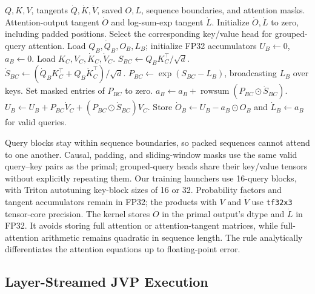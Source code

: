 \documentclass{article} %
\begin{document}
\begin{algorithm}[H]
\caption{Tiled attention JVP using the FlashAttention output and log-sum-exp}
\label{alg:attention-jvp}
\begin{algorithmic}[1]
\Require \(Q,K,V\), tangents \(\dot Q,\dot K,\dot V\), saved \(O,L\),
sequence boundaries, and attention masks.
\Ensure Attention-output tangent \(\dot O\) and log-sum-exp tangent \(\dot L\).
\State Initialize \(\dot O,\dot L\) to zero, including padded positions.
    \State Select the corresponding key/value head for grouped-query attention.
    \State Load \(Q_B,\dot Q_B,O_B,L_B\); initialize FP32 accumulators
        \(U_B\gets0\), \(a_B\gets0\).
        \State Load \(K_C,V_C,\dot K_C,\dot V_C\).
        \State \(S_{BC}\gets Q_BK_C^\top/\sqrt d\).
        \State \(\dot S_{BC}\gets(\dot Q_BK_C^\top+Q_B\dot K_C^\top)/\sqrt d\).
        \State \(P_{BC}\gets\exp(S_{BC}-L_B)\), broadcasting \(L_B\) over keys.
        \State Set masked entries of \(P_{BC}\) to zero.
        \State \(a_B\gets a_B+\operatorname{rowsum}(P_{BC}\odot\dot S_{BC})\).
        \State \(U_B\gets U_B+P_{BC}\dot V_C+(P_{BC}\odot\dot S_{BC})V_C\).
    \EndFor
    \State Store \(\dot O_B\gets U_B-a_B\odot O_B\) and \(\dot L_B\gets a_B\)
        for valid queries.
\EndFor
\end{algorithmic}
\end{algorithm}

Query blocks stay within sequence boundaries, so packed sequences cannot
attend to one another. Causal, padding, and sliding-window masks use the
same valid query--key pairs as the primal; grouped-query heads share their
key/value tensors without explicitly repeating them. Our training launchers
use 16-query blocks, with Triton autotuning key-block sizes of 16 or 32.
Probability factors and tangent accumulators remain in FP32; the products
with \(V\) and \(\dot V\) use \texttt{tf32x3} tensor-core precision.
The kernel stores \(\dot O\) in the primal output's dtype and \(\dot L\) in FP32.
It avoids storing full attention or attention-tangent matrices, while
full-attention arithmetic remains quadratic in sequence length. The rule
analytically differentiates the attention equations up to floating-point error.

\subsection{Layer-Streamed JVP Execution}
\label{app:layer-streamed-jvp}
\end{document}
